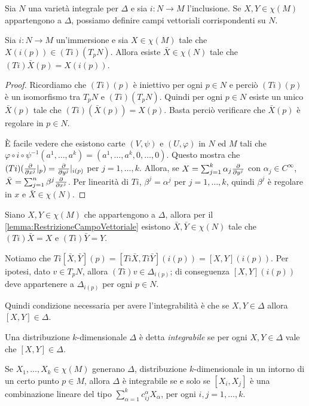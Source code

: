 Sia $N$ una varietà integrale per $\Delta$ e sia $i:N \to M$ l'inclusione.
Se $X,Y\in\chi(M)$ appartengono a $\Delta$, possiamo definire campi vettoriali corrispondenti su $N$.

\begin{lemma}\label{lemma:RestrizioneCampoVettoriale}
	Sia $i:N\to M$ un'immersione e sia $X\in\chi(M)$ tale che \\
	$X(i(p))\in (Ti)(T_pN)$. Allora esiste $\bar X\in\chi(N)$ tale che $(Ti)\bar X (p) = X(i(p))$.
\end{lemma}

\begin{proof}
	Ricordiamo che $(Ti)(p)$ è iniettivo per ogni $p\in N$ e perciò $(Ti)(p)$ è un isomorfismo tra $T_pN$ e $(Ti)(T_pN)$. Quindi per ogni $p\in N$ esiste un unico $\bar X(p)$ tale che $(Ti)(\bar X(p)) = X(p)$. Basta perciò verificare che $\bar X(p)$ è regolare in $p\in N$.
	
	È facile vedere che esistono carte $(V,\psi)$ e $(U,\varphi)$ in $N$ ed $M$ tali che \\
	$\varphi\circ i \circ\psi^{-1}(a^1,\ldots, a^k) = (a^1,\ldots,a^k,0,\ldots,0)$. Questo mostra che \\
	$(Ti)(\frac{\partial }{\partial x^j}|_{p}) = \frac{\partial }{\partial y^j}|_{i(p)}$ per $j=1,\ldots,k$.
	Allora, se $X=\sum_{j=1}^k\alpha_j\frac{\partial }{\partial y^j}$ con $\alpha_j\in C^\infty$, $\bar X = \sum_{j=1}^n\beta^j\frac{\partial }{\partial x^j}$. Per linearità di $Ti$, $\beta^j=\alpha^j$ per $j=1,\ldots,k$, quindi $\beta^j$ è regolare in $x$ e $\bar X\in\chi(N)$.
\end{proof}

Siano $X,Y\in\chi(M)$ che appartengono a $\Delta$, allora per il \cref{lemma:RestrizioneCampoVettoriale} esistono $\bar X,\bar Y\in\chi(N)$ tale che $(Ti)\bar X=X$ e $(Ti)\bar Y=Y$.

Notiamo che $Ti[\bar X,\bar Y](p) = [Ti\bar X,Ti\bar Y](i(p)) = [X,Y] (i(p))$. Per ipotesi, dato $v\in T_pN$, allora $(Ti)v\in\Delta_{i(p)}$; di conseguenza $[X,Y](i(p))$ deve appartenere a $\Delta_{i(p)}$ per ogni $p\in N$.

Quindi condizione necessaria per avere l'integrabilità è che se $X,Y\in\Delta$ allora $[X,Y]\in\Delta$.

\begin{definition}
	Una distribuzione $k$-dimensionale $\Delta$ è detta \emph{integrabile} se per ogni $X,Y\in\Delta$ vale che $[X,Y]\in\Delta$.
\end{definition}

\begin{proposition}
	Se $X_1,\ldots,X_k\in\chi(M)$ generano $\Delta$, distribuzione $k$-dimensionale in un intorno di un certo punto $p\in M$, allora $\Delta$ è integrabile se e solo se $[X_i,X_j]$ è una combinazione lineare del tipo $\sum_{\alpha=1}^kc_{ij}^\alpha X_\alpha$, per ogni $i,j=1,\ldots,k$.
\end{proposition}

